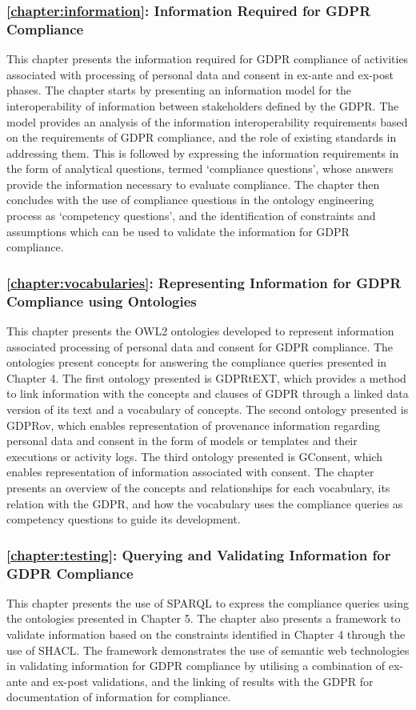 \subsubsection*{\autoref{chapter:information}: Information Required for GDPR Compliance}
This chapter presents the information required for GDPR compliance of activities associated with processing of personal data and consent in ex-ante and ex-post phases.
The chapter starts by presenting an information model for the interoperability of information between stakeholders defined by the GDPR.
The model provides an analysis of the information interoperability requirements based on the requirements of GDPR compliance, and the role of existing standards in addressing them.
This is followed by expressing the information requirements in the form of analytical questions, termed `compliance questions', whose answers provide the information necessary to evaluate compliance. 
The chapter then concludes with the use of compliance questions in the ontology engineering process as `competency questions', and the identification of constraints and assumptions which can be used to validate the information for GDPR compliance.

\subsubsection*{\autoref{chapter:vocabularies}: Representing Information for GDPR Compliance using Ontologies}
This chapter presents the OWL2 ontologies developed to represent information associated processing of personal data and consent for GDPR compliance.
The ontologies present concepts for answering the compliance queries presented in Chapter 4. The first ontology presented is GDPRtEXT, which provides a method to link information with the concepts and clauses of GDPR through a linked data version of its text and a vocabulary of concepts. The second ontology presented is GDPRov, which enables representation of provenance information regarding personal data and consent in the form of models or templates and their executions or activity logs. The third ontology presented is GConsent, which enables representation of information associated with consent. The chapter presents an overview of the concepts and relationships for each vocabulary, its relation with the GDPR, and how the vocabulary uses the compliance queries as competency questions to guide its development.

\subsubsection*{\autoref{chapter:testing}: Querying and Validating Information for GDPR Compliance}
This chapter presents the use of SPARQL to express the compliance queries using the ontologies presented in Chapter 5. The chapter also presents a framework to validate information based on the constraints identified in Chapter 4 through the use of SHACL. The framework demonstrates the use of semantic web technologies in validating information for GDPR compliance by utilising a combination of ex-ante and ex-post validations, and the linking of results with the GDPR for documentation of information for compliance.

